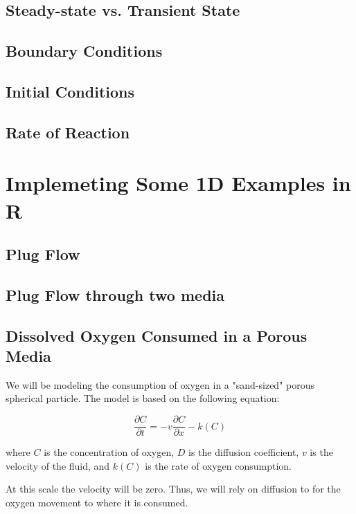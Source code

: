 \documentclass{tufte-handout}\usepackage[]{graphicx}\usepackage[]{xcolor}
\begin{document}
\subsection{Steady-state vs. Transient State}

\subsection{Boundary Conditions}

\subsection{Initial Conditions}

\subsection{Rate of Reaction}





\section{Implemeting Some 1D Examples in R}

\subsection{Plug Flow}

\subsection{Plug Flow through two media}


\subsection{Dissolved Oxygen Consumed in a Porous Media}

We will be modeling the consumption of oxygen in a "sand-sized" porous spherical particle. The model is based on the following equation:

\[ \frac{\partial C}{\partial t} = -v \frac{\partial C}{\partial x} - k(C) \]

where \( C \) is the concentration of oxygen, \( D \) is the diffusion coefficient, \( v \) is the velocity of the fluid, and \( k(C) \) is the rate of oxygen consumption.

At this scale the velocity will be zero. Thus, we will rely on diffusion to for the oxygen movement to where it is consumed. 
\end{document}
